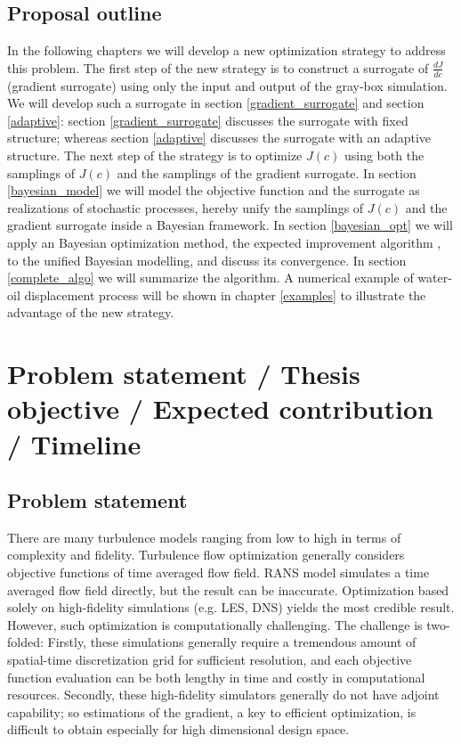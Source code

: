 \documentclass[a4paper,onecolumn]{article}
\theoremstyle{remark}
\begin{document}
\subsection{Proposal outline}
\noindent In the following chapters we will develop a new optimization strategy to address this
problem. 
The first step of the new strategy is to construct a surrogate of $\frac{dJ}{dc}$ 
(gradient surrogate) using only the input and output of the
gray-box simulation. We will develop such a surrogate in section \ref{gradient_surrogate} and section \ref{adaptive}:
section \ref{gradient_surrogate} discusses the surrogate with fixed structure; whereas section \ref{adaptive} discusses the surrogate
with an adaptive structure. The next step of the strategy is to optimize $J(c)$ using both the
samplings of $J(c)$ and the samplings of the gradient surrogate.
In section \ref{bayesian_model} we will model the objective function and the surrogate as
realizations of stochastic processes, hereby
unify the samplings of $J(c)$ and the gradient surrogate inside a Bayesian framework. In section \ref{bayesian_opt} we will apply an Bayesian optimization method, 
the expected improvement algorithm \cite{jones1998},
to the unified Bayesian modelling, and discuss its convergence. In section \ref{complete_algo} we will summarize the algorithm. A numerical example of water-oil displacement process will be shown in chapter \ref{examples} to illustrate the advantage of the new strategy.\\

\newpage
\section{Problem statement / Thesis objective / Expected contribution / Timeline}
\subsection{Problem statement}

\noindent There are many turbulence models ranging from low to high in terms of complexity and fidelity. 
Turbulence flow optimization generally considers objective functions of time averaged flow field. RANS model simulates a time averaged flow field directly, but the result can be inaccurate. Optimization based solely on high-fidelity simulations (e.g. LES, DNS) yields the most credible result. However, such optimization is computationally challenging. The challenge is two-folded: Firstly, these simulations generally require a tremendous amount of spatial-time discretization grid for sufficient resolution, and each objective function evaluation can be both lengthy in time and costly in computational resources. Secondly, these high-fidelity simulators generally do not have adjoint capability; so estimations of the gradient, a key to efficient optimization, is difficult to obtain especially for high dimensional design space.\\
\end{document}

